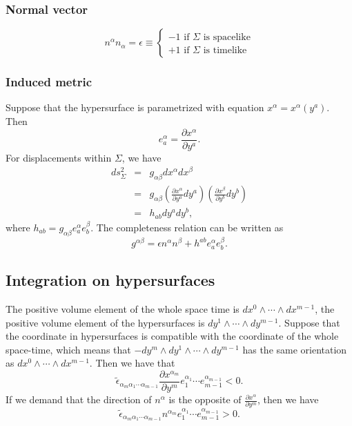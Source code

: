 \subsubsection{Normal vector}
\[n^{\alpha}n_{\alpha} = \epsilon \equiv \begin{cases} -1 \mbox{ if  } \Sigma \mbox{ is spacelike}\\ +1 \mbox{ if  } \Sigma \mbox{ is timelike}\end{cases} \]
\subsubsection{Induced metric}
\noindent
Suppose that the hypersurface is parametrized with equation $x^{\alpha} = x^{\alpha}(y^a)$. 
Then
\[e_{a}^{\alpha} = \frac{\partial x^{\alpha}}{\partial y^a}.\]
For displacements within $\Sigma$, we have
\begin{eqnarray}
ds_{\Sigma}^{2} &=& g_{\alpha \beta} dx^{\alpha} dx^{\beta} \nonumber \\
&=& g_{\alpha \beta} (\frac{\partial x^{\alpha}}{\partial y^a} dy^a) (\frac{\partial x^{\beta}}{\partial y^b} dy^b) \nonumber \\
&=& h_{ab} dy^a dy^b, \nonumber
\end{eqnarray}
where $h_{ab} = g_{\alpha \beta} e_{a}^{\alpha} e_{b}^{\beta}$.
The completeness relation can be written as
\[g^{\alpha \beta} = \epsilon n^{\alpha} n^{\beta} + h^{ab}e_{a}^{\alpha} e_{b}^{\beta} .\]

\subsection{Integration on hypersurfaces}
\noindent
The positive volume element of the whole space time is $dx^{0} \wedge \cdots \wedge dx^{m-1}$, the positive volume element of the hypersurfaces is $dy^{1} \wedge \cdots \wedge dy^{m-1}$.
Suppose that the coordinate in hypersurfaces is compatible with the  coordinate of the whole space-time, which means that $-dy^{m} \wedge dy^1 \wedge \cdots \wedge dy^{m-1} $ has the same orientation as $dx^0 \wedge \cdots \wedge dx^{m-1}$. Then we have that
\[\tilde{\epsilon}_{\alpha_{m} \alpha_{1} \cdots \alpha_{m-1}} \frac{\partial x^{\alpha_m}}{\partial y^m} e_1^{\alpha_1} \cdots e_{m-1}^{\alpha_{m-1}} < 0.\]
If we demand that the direction of $n^{\alpha}$ is the opposite of $\frac{\partial x^{\alpha}}{\partial y^m}$, then we have
\[\tilde{\epsilon}_{\alpha_{m} \alpha_{1} \cdots \alpha_{m-1}} n^{\alpha_m} e_1^{\alpha_1} \cdots e_{m-1}^{\alpha_{m-1}} > 0.\]

